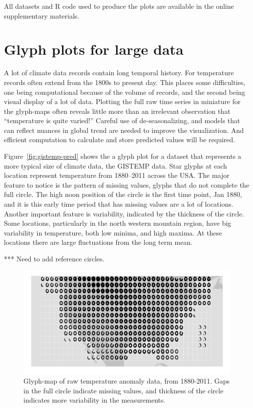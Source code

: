 \documentclass[oneside]{article}
\begin{document}
All datasets and R code used to produce the plots are available in the online supplementary materials.

\section{Glyph plots for large data}
\label{sec:large-data}

A lot of climate data records contain long temporal history. For temperature records often extend from the 1800s to present day. This places some difficulties, one being computational because of the volume of records, and the second being visual display of a lot of data. Plotting the full raw time series in miniature for the glyph-maps often reveals little more than an irrelevant observation that ``temperature is quite varied!'' Careful use of de-seasonalizing, and models that can reflect nuances in global trend are needed to improve the visualization. And efficient computation to calculate and store predicted values will be required.

Figure~\ref{fig:gistemp-pred} shows the a glyph plot for a dataset that represents a more typical size of climate data, the GISTEMP data. Star glyphs at each location represent temperature from 1880--2011 across the USA. The major feature to notice is the pattern of missing values, glyphs that do not complete the full circle. The high noon position of the circle is the first time point, Jan 1880, and it is this early time period that has missing values are a lot of locations. Another important feature is variability, indicated by the thickness of the circle. Some locations, particularly in the north western mountain region, have big variability in temperature, both low minima, and high maxima. At these locations there are large fluctuations from the long term mean.

*** Need to add reference circles.

\begin{figure}[htbp]
  \centering

  \includegraphics[width=1\linewidth]{gistemp-polar-raw}

  \caption{Glyph-map of raw temperature anomaly data, from 1880-2011. Gaps in the full circle indicate missing values, and thickness of the circle indicates more variability in the measurements.}
  \label{fig:gistemp-raw}
\end{figure}
\end{document}
